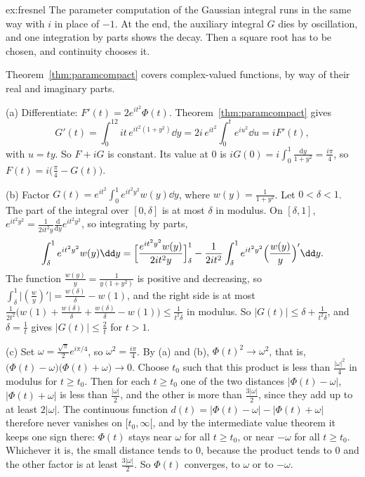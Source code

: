 \begin{solution}{ex:fresnel}
\idea The parameter computation of the Gaussian integral runs in the same way with $i$ in place of $-1$. At the end, the auxiliary integral $G$ dies by oscillation, and one integration by parts shows the decay. Then a square root has to be chosen, and
continuity chooses it.

\writeup Theorem~\ref{thm:paramcompact} covers complex-valued functions, by way of their real and imaginary parts.

(a) Differentiate: $F'(t)=2e^{it^2}\Phi(t)$. Theorem~\ref{thm:paramcompact} gives
\[
G'(t)=\int_0^12it\,e^{it^2(1+y^2)}\dd y=2i\,e^{it^2}\int_0^te^{iu^2}\dd u=iF'(t),
\]
with $u=ty$. So $F+iG$ is constant. Its value at $0$ is $iG(0)=i\int_0^1\frac{\mathrm dy}{1+y^2}=\frac{i\pi}4$, so $F(t)=i\bigl(\frac\pi4-G(t)\bigr)$.

(b) Factor $G(t)=e^{it^2}\int_0^1e^{it^2y^2}w(y)\dd y$, where $w(y)=\frac1{1+y^2}$. Let $0<\delta<1$. The part of the integral over $[0,\delta]$ is at most $\delta$ in
modulus. On $[\delta,1]$, $e^{it^2y^2}=\frac1{2it^2y}\frac{\mathrm d}{\mathrm dy}e^{it^2y^2}$, so integrating by parts,
\[
\int_\delta^1e^{it^2y^2}w(y)\dd y=\Bigl[\frac{e^{it^2y^2}w(y)}{2it^2y}\Bigr]_\delta^1-\frac1{2it^2}\int_\delta^1e^{it^2y^2}\Bigl(\frac{w(y)}y\Bigr)'\dd y.
\]
The function $\frac{w(y)}y=\frac1{y(1+y^2)}$ is positive and decreasing, so $\int_\delta^1\bigl|(\frac wy)'\bigr|=\frac{w(\delta)}\delta-w(1)$, and the right side is at
most $\frac1{2t^2}\bigl(w(1)+\frac{w(\delta)}\delta+\frac{w(\delta)}\delta-w(1)\bigr)\le\frac1{t^2\delta}$ in modulus. So $|G(t)|\le\delta+\frac1{t^2\delta}$, and $\delta=\frac1t$ gives $|G(t)|\le\frac2t$ for $t>1$.

(c) Set $\omega=\frac{\sqrt\pi}2e^{i\pi/4}$, so $\omega^2=\frac{i\pi}4$. By (a) and (b), $\Phi(t)^2\to\omega^2$, that is,
$\bigl(\Phi(t)-\omega\bigr)\bigl(\Phi(t)+\omega\bigr)\to0$. Choose $t_0$ such that this product is less than $\frac{|\omega|^2}4$ in modulus for $t\ge t_0$. Then for each
$t\ge t_0$ one of the two distances $|\Phi(t)-\omega|$, $|\Phi(t)+\omega|$ is less than $\frac{|\omega|}2$, and the other is more than $\frac{3|\omega|}2$, since they add up to at
least $2|\omega|$. The continuous function $d(t)=|\Phi(t)-\omega|-|\Phi(t)+\omega|$ therefore never vanishes on $[t_0,\infty[$, and by the intermediate value theorem it
keeps one sign there: $\Phi(t)$ stays near $\omega$ for all $t\ge t_0$, or near $-\omega$ for all $t\ge t_0$. Whichever it is, the small distance tends to $0$, because the
product tends to $0$ and the other factor is at least $\frac{3|\omega|}2$. So $\Phi(t)$ converges, to $\omega$ or to $-\omega$.


\end{solution}
